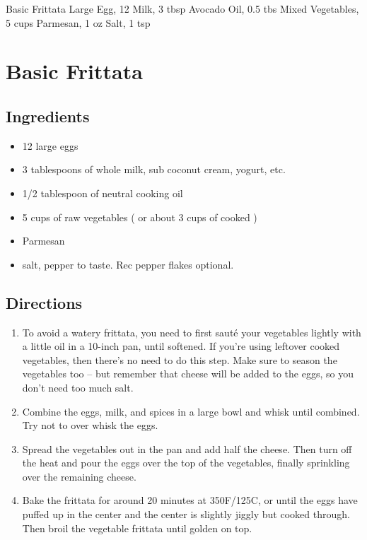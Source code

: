 Basic Frittata
  Large Egg, 12
  Milk, 3 tbsp
  Avocado Oil, 0.5 tbs
  Mixed Vegetables, 5 cups
  Parmesan, 1 oz
  Salt, 1 tsp

\section{ Basic Frittata }

\subsection{ Ingredients }

\begin{itemize}
  \item 12 large eggs
  \item 3 tablespoons of whole milk, sub coconut cream, yogurt, etc.
  \item 1/2 tablespoon of neutral cooking oil
  \item 5 cups of raw vegetables ( or about 3 cups of cooked )
  \item Parmesan
  \item salt, pepper to taste. Rec pepper flakes optional.
\end{itemize}

\subsection{ Directions }

\begin{enumerate}
  \item To avoid a watery frittata, you need to first sauté your vegetables lightly with a little oil in a 10-inch pan, until softened. If you’re using leftover cooked vegetables, then there’s no need to do this step. Make sure to season the vegetables too – but remember that cheese will be added to the eggs, so you don’t need too much salt.
  \item Combine the eggs, milk, and spices in a large bowl and whisk until combined. Try not to over whisk the eggs.
  \item Spread the vegetables out in the pan and add half the cheese. Then turn off the heat and pour the eggs over the top of the vegetables, finally sprinkling over the remaining cheese.
  \item Bake the frittata for around 20 minutes at 350F/125C, or until the eggs have puffed up in the center and the center is slightly jiggly but cooked through. Then broil the vegetable frittata until golden on top.
\end{enumerate}
